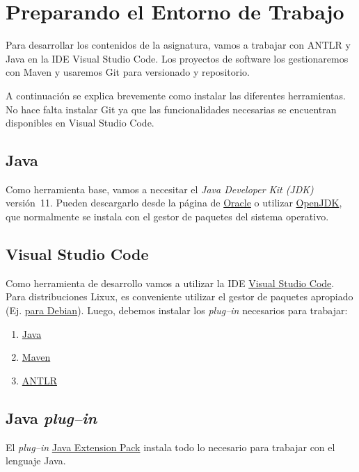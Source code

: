 \section{Preparando el Entorno de Trabajo}
\label{intro}

Para desarrollar los contenidos de la asignatura, vamos a trabajar con ANTLR y Java en la IDE Visual Studio Code.  Los proyectos de software los gestionaremos con Maven y usaremos Git para versionado y repositorio.

A continuación se explica brevemente como instalar las diferentes herramientas.  No hace falta instalar Git ya que las funcionalidades necesarias se encuentran disponibles en Visual Studio Code.

\subsection{Java}
\label{Java}

Como herramienta base, vamos a necesitar el \emph{Java Developer Kit (JDK)} versión~11. Pueden descargarlo desde la página de \href{https://www.oracle.com/java/technologies/javase-downloads.html}{Oracle} o utilizar \href{https://openjdk.java.net/}{OpenJDK}, que normalmente se instala con el gestor de paquetes del sistema operativo.


\subsection{Visual Studio Code}
\label{vscode}

Como herramienta de desarrollo vamos a utilizar la IDE \href{https://code.visualstudio.com/}{Visual Studio Code}.  Para distribuciones Lixux, es conveniente utilizar el gestor de paquetes apropiado (Ej. \href{https://wiki.debian.org/VisualStudioCode}{para Debian}).  Luego, debemos instalar los \emph{plug--in} necesarios para trabajar:
\begin{enumerate}
	\item \hyperref[pluginJava]{Java}
	\item \hyperref[pluginMaven]{Maven}
	\item \hyperref[pluginANTLR]{ANTLR}
\end{enumerate}

\subsection{Java \emph{plug--in}}
\label{pluginJava}

El \emph{plug--in} \href{https://marketplace.visualstudio.com/items?itemName=vscjava.vscode-java-pack}{Java Extension Pack} instala todo lo necesario para trabajar con el lenguaje Java.

